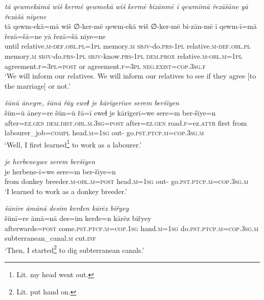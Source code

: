 \ea \label{ŽE.83}
\textit{tā qewmekāmā wiš kermē qewmekā wiš kermē bizānmē ī qewmīmā řezāšāne yā řezāšā nīyene} \\ 
\gll tā qewm-ekā=mā wiš ∅-ker-mē qewm-ekā wiš ∅-ker-mē bi-zān-mē ī qewm-ī=mā řezā=šā=ne yā řezā=šā nīye=ne \\ 
 until relative\textsc{.m}\textsc{-def}\textsc{.obl}\textsc{.pl}\textsc{=1pl} memory\textsc{.m} \textsc{sbjv-}do\textsc{.prs}\textsc{-1pl} relative\textsc{.m}\textsc{-def}\textsc{.obl}\textsc{.pl} memory\textsc{.m} \textsc{sbjv-}do\textsc{.prs}\textsc{-1pl} \textsc{sbjv-}know\textsc{.prs}\textsc{-1pl} \textsc{dem.prox} relative\textsc{.m}\textsc{-obl}\textsc{.m}\textsc{=1pl} agreement\textsc{.f}\textsc{=3pl}\textsc{=\textsc{post}} or agreement\textsc{.f}\textsc{=3pl} \textsc{\textsc{neg.}exist}\textsc{=cop}\textsc{.3sg}\textsc{.f} \\ 
\glt `We will inform our relatives. We will inform our relatives to see if they agree [to the  marriage] or not.'
\z 
 
\ea \label{ŽM.4}
\textit{šūnū āneyre, šūnū řāy eweɫ je kārīgerīwe serem beršīyen} \\ 
\gll šūn=ū āney=re šūn=ū řā=ī eweɫ je kārīgerī=we sere=m ber-šīye=n \\ 
 after\textsc{=ez.gen} \textsc{dem.dist}\textsc{.obl}\textsc{.m}\textsc{.3sg}\textsc{=\textsc{post}} after\textsc{=ez.gen} road\textsc{.f}=ez.\textsc{attr} first from labourer\_job\textsc{=compl} head\textsc{.m}\textsc{=\textsc{1sg}} out- go\textsc{.pst}\textsc{.ptcp}\textsc{.m}\textsc{=cop}\textsc{.3sg}\textsc{.m} \\ 
\glt `Well, I first learned\footnote{Lit. my head went out.}  to work as a labourer.'
\z 
 
\ea \label{ŽM.5}
\textit{je herbeneywe serem beršīyen} \\ 
\gll je herbene-ī=we sere=m ber-šīye=n \\ 
 from donkey breeder\textsc{.m}\textsc{-obl}\textsc{.m}\textsc{=\textsc{post}} head\textsc{.m}\textsc{=\textsc{1sg}} out- go\textsc{.pst}\textsc{.ptcp}\textsc{.m}\textsc{=cop}\textsc{.3sg}\textsc{.m} \\ 
\glt `I learned to work as a donkey breeder.'
\z 
 
\ea \label{ŽM.6}
\textit{šūnīre āmānā desim kerđen kārēz biřyey} \\ 
\gll šūnī=re āmā=nā des=im kerđe=n kārēz biřyey \\ 
 afterwards\textsc{=\textsc{post}} come\textsc{.pst}\textsc{.ptcp}\textsc{.m}\textsc{=cop}\textsc{.\textsc{1sg}} hand\textsc{.m}\textsc{=\textsc{1sg}} do\textsc{.pst}\textsc{.ptcp}\textsc{.m}\textsc{=cop}\textsc{.3sg}\textsc{.m} subterranean\_canal\textsc{.m} cut\textsc{.inf} \\ 
\glt `Then, I started\footnote{Lit. put hand on.} to dig subterranean canals.'
\z 
 
